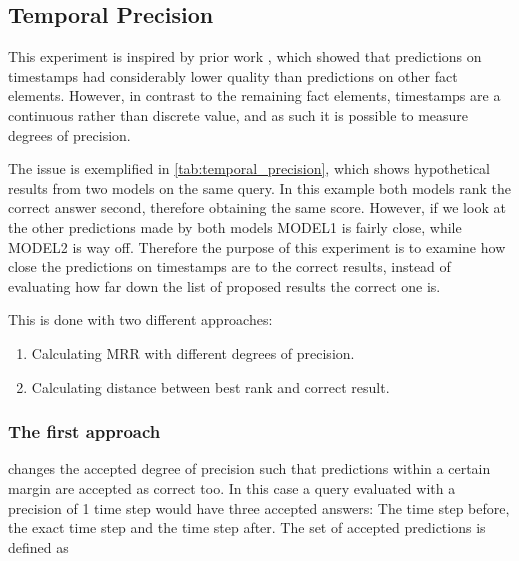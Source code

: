\subsection{Temporal Precision}
\label{subsec:temporal_precision}


This experiment is inspired by prior work \cite{P9}, which showed that predictions on timestamps had considerably lower quality than predictions on other fact elements.
However, in contrast to the remaining fact elements, timestamps are a continuous rather than discrete value, and as such it is possible to measure degrees of precision.



The issue is exemplified in \autoref{tab:temporal_precision}, which shows hypothetical results from two models on the same query.
In this example both models rank the correct answer second, therefore obtaining the same score.
However, if we look at the other predictions made by both models \textsc{MODEL1} is fairly close, while \textsc{MODEL2} is way off.
Therefore the purpose of this experiment is to examine how close the  predictions on timestamps are to the correct results, instead of evaluating how far down the list of proposed results the correct one is.

This is done with two different approaches:
\begin{enumerate}
    \item Calculating MRR with different degrees of precision.
    \item Calculating distance between best rank and correct result.
\end{enumerate}

\subsubsection{The first approach} changes the accepted degree of precision such that predictions within a certain margin are accepted as correct too. In this case a query evaluated with a precision of 1 time step would have three accepted answers: The time step before, the exact time step and the time step after. The set of accepted predictions is defined as 

